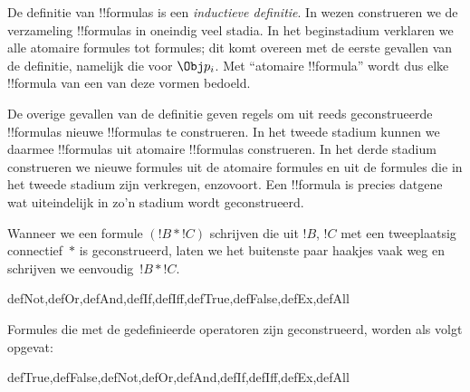 \documentclass[../../../include/open-logic-section]{subfiles}
\begin{document}
\begin{explain}
De definitie van !!{formula}s is een \emph{inductieve definitie}. In
wezen construeren we de verzameling !!{formula}s in oneindig veel
stadia. In het beginstadium verklaren we alle atomaire formules tot
formules; dit komt overeen met de eerste gevallen van de definitie,
namelijk die voor
%
%
$\Obj p_i$. Met ``atomaire !!{formula}'' wordt dus elke !!{formula} van
een van deze vormen bedoeld.

De overige gevallen van de definitie geven regels om uit reeds
geconstrueerde !!{formula}s nieuwe !!{formula}s te construeren. In het
tweede stadium kunnen we daarmee !!{formula}s uit atomaire
!!{formula}s construeren. In het derde stadium construeren we nieuwe
formules uit de atomaire formules en uit de formules die in het tweede
stadium zijn verkregen, enzovoort. Een !!{formula} is precies datgene
wat uiteindelijk in zo'n stadium wordt geconstrueerd.
\end{explain}

Wanneer we een formule $(!B \ast !C)$ schrijven die uit $!B$, $!C$ met
een tweeplaatsig connectief~$\ast$ is geconstrueerd, laten we het
buitenste paar haakjes vaak weg en schrijven we eenvoudig~$!B \ast !C$.

\begin{tagblock}{defNot,defOr,defAnd,defIf,defIff,defTrue,defFalse,defEx,defAll}
\begin{defn}
Formules die met de gedefinieerde operatoren zijn geconstrueerd, worden
als volgt opgevat:

\begin{tagenumerate}{defTrue,defFalse,defNot,defOr,defAnd,defIf,defIff,defEx,defAll}







\end{tagenumerate}
\end{defn}
\end{tagblock}
\end{document}
